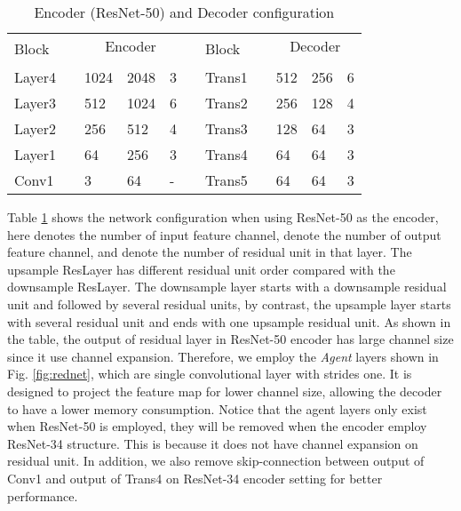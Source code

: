 \documentclass[runningheads]{llncs}
\begin{document}
\begin{table}[!b]
    \footnotesize
    \caption{Encoder (ResNet-50) and Decoder configuration}
    \label{tab:maps_configuration}
    \centering
    \begin{tabular}{ m{3em} m{0.5em} m{2.5em} m{2.5em} m{2.5em} m{2em} m{3em} m{0.5em} m{2.5em} m{2.5em} m{2.5em} }
        \toprule
        \multirow{2}{*}{Block} & &\multicolumn{3}{c}{Encoder} & &\multirow{2}{*}{Block} & &\multicolumn{3}{c}{Decoder} \\
        \cmidrule{3-5} \cmidrule{9-11}
                & &     &      & & & & &  & & \\
        \midrule
        Layer4  & &1024    &2048     &3   & &Trans1    & &512     &256   &6\\
        Layer3  & &512     &1024     &6   & &Trans2    & &256     &128   &4\\
        Layer2  & &256     &512      &4   & &Trans3    & &128     &64    &3\\
        Layer1  & &64      &256      &3   & &Trans4    & &64      &64    &3\\
        Conv1   & &3       &64       &-   & &Trans5    & &64      &64    &3\\
        \bottomrule
    \end{tabular}
\end{table}

Table \ref{tab:maps_configuration} shows the network configuration when using ResNet-50 as the encoder, here  denotes the number of input feature channel,  denote the number of output feature channel, and  denote the number of residual unit in that layer. The upsample ResLayer has different residual unit order compared with the downsample ResLayer. The downsample layer starts with a downsample residual unit and followed by several residual units, by contrast, the upsample layer starts with several residual unit and ends with one upsample residual unit. As shown in the table, the output of residual layer in ResNet-50 encoder has large channel size since it use channel expansion. Therefore, we employ the \textit{Agent} layers shown in Fig. \ref{fig:rednet}, which are single  convolutional layer with strides one. It is designed to project the feature map for lower channel size, allowing the decoder to have a lower memory consumption. Notice that the agent layers only exist when ResNet-50 is employed, they will be removed when the encoder employ ResNet-34 structure. This is because it does not have channel expansion on residual unit. In addition, we also remove skip-connection between output of Conv1 and output of Trans4 on ResNet-34 encoder setting for better performance. 
\end{document}

